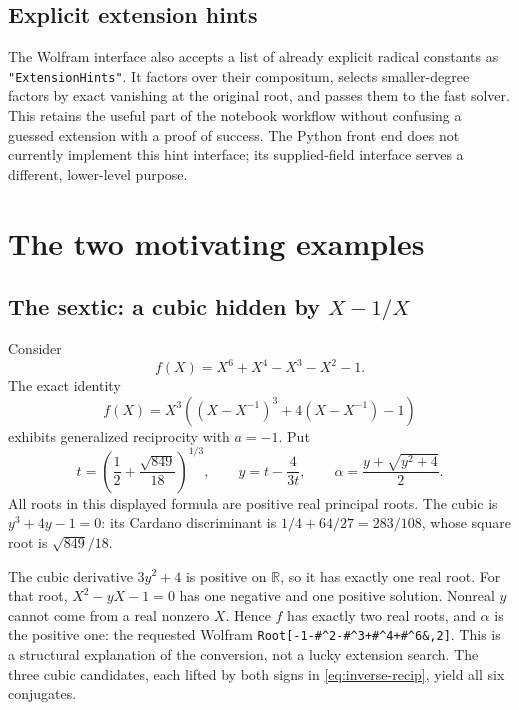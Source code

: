 \documentclass[11pt,letterpaper]{article}
\newcommand{\code}[1]{\texttt{#1}}
\theoremstyle{definition}\newtheorem{definition}[theorem]{Definition}
\theoremstyle{remark}\newtheorem{remark}[theorem]{Remark}
\begin{document}
\subsection{Explicit extension hints}

The Wolfram interface also accepts a list of already explicit radical
constants as \code{"ExtensionHints"}. It factors over their compositum,
selects smaller-degree factors by exact vanishing at the original root, and
passes them to the fast solver. This retains the useful part of the notebook
workflow without confusing a guessed extension with a proof of success.
The Python front end does not currently implement this hint interface;
its supplied-field interface serves a different, lower-level purpose.

\section{The two motivating examples}
\label{sec:examples}

\subsection{The sextic: a cubic hidden by \texorpdfstring{\(X-1/X\)}{X-1/X}}

Consider
\[
             f(X)=X^6+X^4-X^3-X^2-1.
\]
The exact identity
\begin{equation}
 f(X)=X^3\left((X-X^{-1})^3+4(X-X^{-1})-1\right)             \label{eq:sextic}
\end{equation}
exhibits generalized reciprocity with \(a=-1\). Put
\begin{equation}
 t=\left(\frac12+\frac{\sqrt{849}}{18}\right)^{1/3},\qquad
 y=t-\frac4{3t},\qquad
 \alpha=\frac{y+\sqrt{y^2+4}}2.                              \label{eq:sexticrad}
\end{equation}
All roots in this displayed formula are positive real principal roots.
The cubic is \(y^3+4y-1=0\): its Cardano discriminant is
\(1/4+64/27=283/108\), whose square root is \(\sqrt{849}/18\).

The cubic derivative \(3y^2+4\) is positive on \(\mathbb R\), so it has exactly
one real root. For that root, \(X^2-yX-1=0\) has one negative and one positive
solution. Nonreal \(y\) cannot come from a real nonzero \(X\). Hence \(f\) has
exactly two real roots, and \(\alpha\) is the positive one: the requested
Wolfram \code{Root[-1-\#\^{}2-\#\^{}3+\#\^{}4+\#\^{}6\&,2]}.
This is a structural explanation of the conversion, not a lucky extension
search. The three cubic candidates, each lifted by both signs in
\eqref{eq:inverse-recip}, yield all six conjugates.
\end{document}
